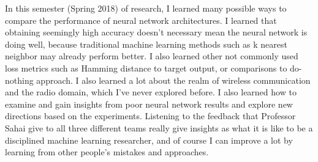 \documentclass[10pt,twocolumn,letterpaper]{article}
\begin{document}
In this semester (Spring 2018) of research, I learned many possible ways to compare the performance of neural network architectures. I learned that obtaining seemingly high accuracy doesn't necessary mean the neural network is doing well, because traditional machine learning methods such as k nearest neighbor may already perform better. I also learned other not commonly used loss metrics such as Hamming distance to target output, or comparisons to do-nothing approach. I also learned a lot about the realm of wireless communication and the radio domain, which I've never explored before. I also learned how to examine and gain insights from poor neural network results and explore new directions based on the experiments. Listening to the feedback that Professor Sahai give to all three different teams really give insights as what it is like to be a disciplined machine learning researcher, and of course I can improve a lot by learning from other people's mistakes and approaches.
\end{document}
